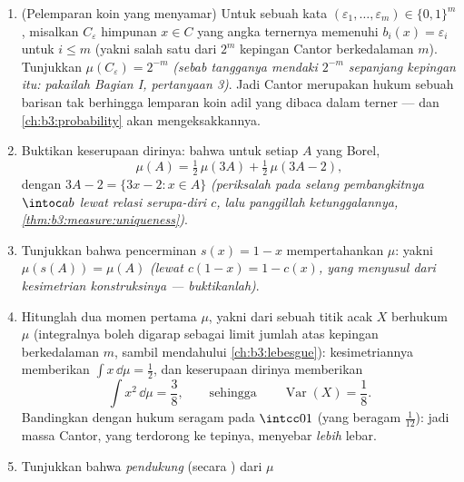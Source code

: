 \begin{problem}
\begin{enumerate}[resume]
        setiap $x$ \emph{(lewat  $c$)}. Jadi ada 
        peluang tanpa atom yang dibawa sebuah  berukuran nol Lebesgue:
        bandingkan dengan  yang sudah kita lihat sejauh ini.
  \item (Pelemparan koin yang menyamar) Untuk sebuah kata $(\varepsilon_1,
        \dots, \varepsilon_m) \in \{0,1\}^m$, misalkan
        $C_{\varepsilon}$ himpunan $x \in C$ yang angka ternernya
        memenuhi $b_i(x) = \varepsilon_i$ untuk $i \leq m$
        (yakni salah satu dari $2^m$ kepingan Cantor berkedalaman $m$). Tunjukkan
        $\mu(C_\varepsilon) = 2^{-m}$ \emph{(sebab tangganya
        mendaki $2^{-m}$ sepanjang kepingan itu: pakailah Bagian I,
        pertanyaan 3)}. Jadi  Cantor merupakan hukum sebuah
        barisan tak berhingga lemparan koin adil yang dibaca dalam terner
        --- dan \cref{ch:b3:probability} akan mengeksakkannya.
  \item Buktikan keserupaan dirinya: bahwa untuk setiap $A$ yang Borel,
        \[
        \mu(A) = \tfrac12\,\mu(3A) +
        \tfrac12\,\mu(3A - 2) ,
        \]
        dengan $3A - 2 = \{3x - 2 : x \in A\}$ \emph{(periksalah
        pada selang pembangkitnya $\intoc ab$ lewat relasi
        serupa-diri $c$, lalu panggillah ketunggalannya,
        \cref{thm:b3:measure:uniqueness})}.
  \item Tunjukkan bahwa pencerminan $s(x) = 1 - x$ mempertahankan
        $\mu$: yakni $\mu(s(A)) = \mu(A)$ \emph{(lewat $c(1 - x) = 1 -
        c(x)$, yang menyusul dari kesimetrian
        konstruksinya --- buktikanlah)}.
  \item Hitunglah dua momen pertama $\mu$, yakni dari sebuah
        titik acak $X$ berhukum $\mu$ (integralnya boleh
        digarap sebagai limit jumlah atas kepingan berkedalaman $m$,
        sambil mendahului \cref{ch:b3:lebesgue}): kesimetriannya memberikan
        $\int x\,\dd\mu = \frac12$, dan keserupaan dirinya memberikan
        \[
        \int x^2\,\dd\mu = \frac38,
        \qquad\text{sehingga}\qquad
        \operatorname{Var}(X) = \frac18 .
        \]
        Bandingkan dengan hukum seragam pada $\intcc01$ (yang beragam
        $\frac1{12}$): jadi massa Cantor, yang terdorong ke tepinya,
        menyebar \emph{lebih} lebar.
  \item Tunjukkan bahwa \emph{pendukung} (secara ) dari $\mu$

\end{enumerate}
\end{problem}
